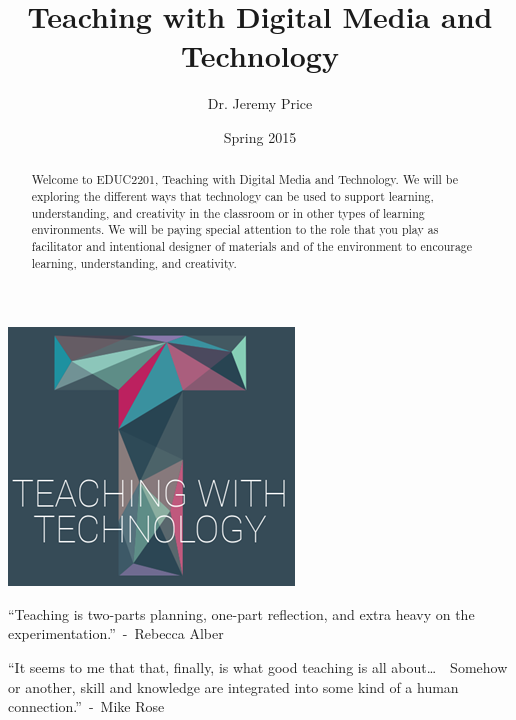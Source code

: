 \documentclass{tufte-handout}
\title{Teaching with Digital Media and Technology}
\author{Dr. Jeremy Price}
\date{Spring 2015}  %
\begin{document}
\maketitle%



\begin{abstract}
Welcome to EDUC2201, Teaching with Digital Media and Technology. We will be exploring the different ways that technology can be used to support learning, understanding, and creativity in the classroom or in other types of learning environments. We will be paying special attention to the role that you play as facilitator and intentional designer of materials and of the environment to encourage learning, understanding, and creativity.\end{abstract}

\bigskip

\begin{fullwidth}
\begin{center}

	\includegraphics[width=0.20\linewidth]{twt-logo.png}

	\bigskip

	\Large
	\enquote{Teaching is two-parts planning, one-part reflection, and extra heavy on the experimentation.}~-~Rebecca Alber

	\bigskip

	\enquote{It seems to me that that, finally, is what good teaching is all about\ldots~~Somehow or another, skill and knowledge are integrated into some kind of a human connection.}~-~Mike Rose

	\normalsize
\end{center}
\end{fullwidth}
\end{document}
